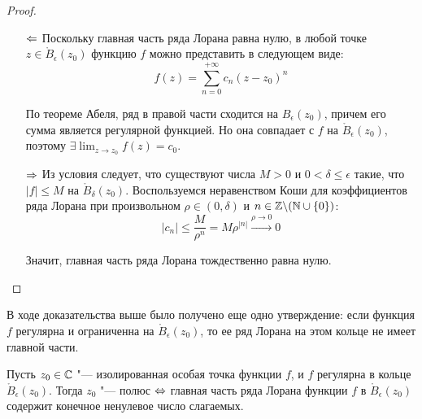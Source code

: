 \begin{proof}~
	\begin{itemize}
		\item[$\Leftarrow$]Поскольку главная часть ряда Лорана равна нулю, в любой точке $z \in \mathring B_\epsilon(z_0)$ функцию $f$ можно \pagebreak представить в следующем виде:
		\[f(z) = \sum_{n = 0}^{+\infty}c_n(z - z_0)^n\]
		
		По теореме Абеля, ряд в правой части сходится на $B_\epsilon(z_0)$, причем его сумма является регулярной функцией. Но она совпадает с $f$ на $\mathring B_\epsilon(z_0)$, поэтому $\exists \lim_{z \to z_0}f(z) = c_0$.
		
		\item[$\Rightarrow$]Из условия следует, что существуют числа $M > 0$ и $0 < \delta \le \epsilon$ такие, что $|f| \le M$ на $\mathring B_\delta(z_0)$. Воспользуемся неравенством Коши для коэффициентов ряда Лорана при произвольном $\rho \in (0, \delta)$ и $n \in \mathbb{Z} \backslash (\mathbb{N} \cup \{0\})$:
		\[|c_n| \le \frac{M}{\rho^n} = M\rho^{|n|} \xrightarrow{\rho \to 0} 0\]
		
		Значит, главная часть ряда Лорана тождественно равна нулю.\qedhere
	\end{itemize}
\end{proof}

\begin{note}
	В ходе доказательства выше было получено еще одно утверждение: если функция $f$ регулярна и ограниченна на $\mathring B_\epsilon(z_0)$, то ее ряд Лорана на этом кольце не имеет главной части.
\end{note}

\begin{proposition}
	Пусть $z_0 \in \mathbb{C}$ "--- изолированная особая точка функции $f$, и $f$ регулярна в кольце $\mathring B_\epsilon(z_0)$. Тогда $z_0$ "--- полюс $\Leftrightarrow$ главная часть ряда Лорана функции $f$ в $\mathring B_\epsilon(z_0)$ содержит конечное ненулевое число слагаемых.
\end{proposition}

